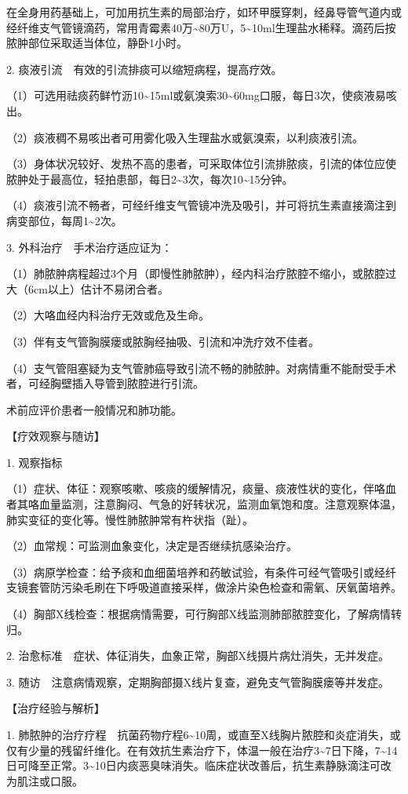 在全身用药基础上，可加用抗生素的局部治疗，如环甲膜穿刺，经鼻导管气道内或经纤维支气管镜滴药，常用青霉素40万\textasciitilde{}80万U，5\textasciitilde{}10ml生理盐水稀释。滴药后按脓肿部位采取适当体位，静卧1小时。

2. 痰液引流　有效的引流排痰可以缩短病程，提高疗效。

（1）可选用祛痰药鲜竹沥10\textasciitilde{}15ml或氨溴索30\textasciitilde{}60mg口服，每日3次，使痰液易咳出。

（2）痰液稠不易咳出者可用雾化吸入生理盐水或氨溴索，以利痰液引流。

（3）身体状况较好、发热不高的患者，可采取体位引流排脓痰，引流的体位应使脓肿处于最高位，轻拍患部，每日2\textasciitilde{}3次，每次10\textasciitilde{}15分钟。

（4）痰液引流不畅者，可经纤维支气管镜冲洗及吸引，并可将抗生素直接滴注到病变部位，每周1\textasciitilde{}2次。

3. 外科治疗　手术治疗适应证为：

（1）肺脓肿病程超过3个月（即慢性肺脓肿），经内科治疗脓腔不缩小，或脓腔过大（6cm以上）估计不易闭合者。

（2）大咯血经内科治疗无效或危及生命。

（3）伴有支气管胸膜瘘或脓胸经抽吸、引流和冲洗疗效不佳者。

（4）支气管阻塞疑为支气管肺癌导致引流不畅的肺脓肿。对病情重不能耐受手术者，可经胸壁插入导管到脓腔进行引流。

术前应评价患者一般情况和肺功能。

【疗效观察与随访】

1. 观察指标

（1）症状、体征：观察咳嗽、咳痰的缓解情况，痰量、痰液性状的变化，伴咯血者其咯血量监测，注意胸闷、气急的好转状况，监测血氧饱和度。注意观察体温，肺实变征的变化等。慢性肺脓肿常有杵状指（趾）。

（2）血常规：可监测血象变化，决定是否继续抗感染治疗。

（3）病原学检查：给予痰和血细菌培养和药敏试验，有条件可经气管吸引或经纤支镜套管防污染毛刷在下呼吸道直接采样，做涂片染色检查和需氧、厌氧菌培养。

（4）胸部X线检查：根据病情需要，可行胸部X线监测肺部脓腔变化，了解病情转归。

2. 治愈标准　症状、体征消失，血象正常，胸部X线摄片病灶消失，无并发症。

3. 随访　注意病情观察，定期胸部摄X线片复查，避免支气管胸膜瘘等并发症。

【治疗经验与解析】

1.
肺脓肿的治疗疗程　抗菌药物疗程6\textasciitilde{}10周，或直至X线胸片脓腔和炎症消失，或仅有少量的残留纤维化。在有效抗生素治疗下，体温一般在治疗3\textasciitilde{}7日下降，7\textasciitilde{}14日可降至正常。3\textasciitilde{}10日内痰恶臭味消失。临床症状改善后，抗生素静脉滴注可改为肌注或口服。

